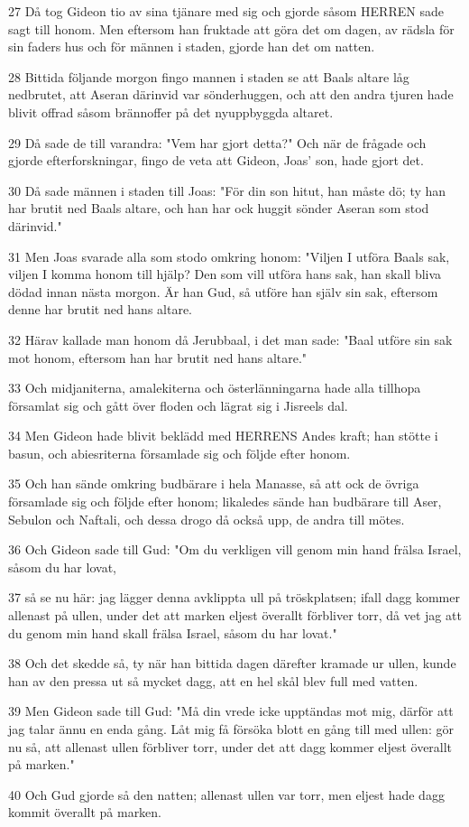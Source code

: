 \par 27 Då tog Gideon tio av sina tjänare med sig och gjorde såsom HERREN sade sagt till honom. Men eftersom han fruktade att göra det om dagen, av rädsla för sin faders hus och för männen i staden, gjorde han det om natten.
\par 28 Bittida följande morgon fingo mannen i staden se att Baals altare låg nedbrutet, att Aseran därinvid var sönderhuggen, och att den andra tjuren hade blivit offrad såsom brännoffer på det nyuppbyggda altaret.
\par 29 Då sade de till varandra: "Vem har gjort detta?" Och när de frågade och gjorde efterforskningar, fingo de veta att Gideon, Joas' son, hade gjort det.
\par 30 Då sade männen i staden till Joas: "För din son hitut, han måste dö; ty han har brutit ned Baals altare, och han har ock huggit sönder Aseran som stod därinvid."
\par 31 Men Joas svarade alla som stodo omkring honom: "Viljen I utföra Baals sak, viljen I komma honom till hjälp? Den som vill utföra hans sak, han skall bliva dödad innan nästa morgon. Är han Gud, så utföre han själv sin sak, eftersom denne har brutit ned hans altare.
\par 32 Härav kallade man honom då Jerubbaal, i det man sade: "Baal utföre sin sak mot honom, eftersom han har brutit ned hans altare."
\par 33 Och midjaniterna, amalekiterna och österlänningarna hade alla tillhopa församlat sig och gått över floden och lägrat sig i Jisreels dal.
\par 34 Men Gideon hade blivit beklädd med HERRENS Andes kraft; han stötte i basun, och abiesriterna församlade sig och följde efter honom.
\par 35 Och han sände omkring budbärare i hela Manasse, så att ock de övriga församlade sig och följde efter honom; likaledes sände han budbärare till Aser, Sebulon och Naftali, och dessa drogo då också upp, de andra till mötes.
\par 36 Och Gideon sade till Gud: "Om du verkligen vill genom min hand frälsa Israel, såsom du har lovat,
\par 37 så se nu här: jag lägger denna avklippta ull på tröskplatsen; ifall dagg kommer allenast på ullen, under det att marken eljest överallt förbliver torr, då vet jag att du genom min hand skall frälsa Israel, såsom du har lovat."
\par 38 Och det skedde så, ty när han bittida dagen därefter kramade ur ullen, kunde han av den pressa ut så mycket dagg, att en hel skål blev full med vatten.
\par 39 Men Gideon sade till Gud: "Må din vrede icke upptändas mot mig, därför att jag talar ännu en enda gång. Låt mig få försöka blott en gång till med ullen: gör nu så, att allenast ullen förbliver torr, under det att dagg kommer eljest överallt på marken."
\par 40 Och Gud gjorde så den natten; allenast ullen var torr, men eljest hade dagg kommit överallt på marken.

